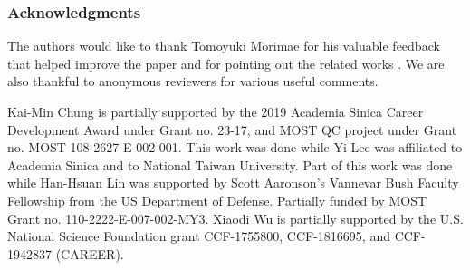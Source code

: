 \small{\subsubsection{Acknowledgments}

The authors would like to thank Tomoyuki Morimae for his valuable feedback that helped improve the paper and for pointing out the related works \cite{takeuchi2018verification, hayashi2015verifiable}.
We are also thankful to anonymous reviewers for various useful comments.

Kai-Min Chung is partially supported by the 2019 Academia Sinica Career Development Award under Grant no. 23-17, and MOST QC project under Grant no. MOST 108-2627-E-002-001.
This work was done while Yi Lee was affiliated to Academia Sinica and to National Taiwan University.
Part of this work was done while Han-Hsuan Lin was supported by Scott Aaronson's Vannevar Bush Faculty Fellowship from the US Department of Defense. Partially funded by MOST Grant no. 110-2222-E-007-002-MY3.
Xiaodi Wu is partially supported by the U.S. National Science Foundation grant CCF-1755800, CCF-1816695, and CCF-1942837 (CAREER).
}